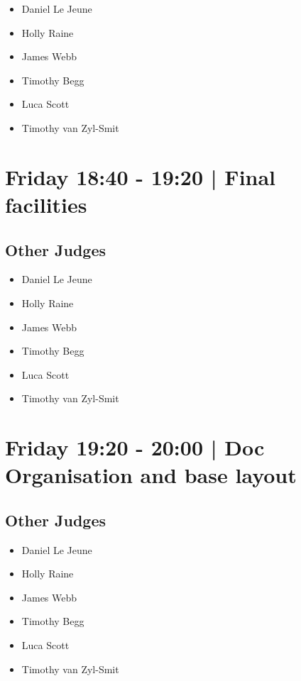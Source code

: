 \documentclass[10pt]{article}
\begin{document}
            \begin{itemize}
                            \item Daniel Le Jeune
                            \item Holly Raine
                            \item James Webb
                            \item Timothy Begg
                            \item Luca Scott
                            \item Timothy van Zyl-Smit
                        \end{itemize}
        

            \section*{Friday 18:40
        -
        19:20
        |
         Final facilities}
        
                
        \subsection*{Other Judges}
        
            \begin{itemize}
                            \item Daniel Le Jeune
                            \item Holly Raine
                            \item James Webb
                            \item Timothy Begg
                            \item Luca Scott
                            \item Timothy van Zyl-Smit
                        \end{itemize}
        

            \section*{Friday 19:20
        -
        20:00
        |
         Doc Organisation and base layout}
        
                
        \subsection*{Other Judges}
        
            \begin{itemize}
                            \item Daniel Le Jeune
                            \item Holly Raine
                            \item James Webb
                            \item Timothy Begg
                            \item Luca Scott
                            \item Timothy van Zyl-Smit
                        \end{itemize}
        
\end{document}
